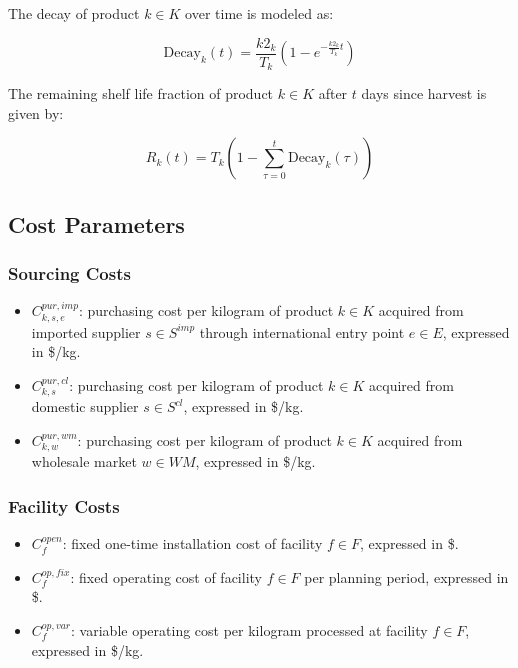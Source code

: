 \documentclass[12pt]{article}
\begin{document}
The decay of product $k \in K$ over time is modeled as:

\[
\text{Decay}_k(t) = \frac{k2_k}{T_k} \left(1 - e^{- \frac{k2_k}{T_k} t} \right)
\]

The remaining shelf life fraction of product $k \in K$ after $t$ days since harvest is given by:

\[
R_k(t) = T_k \left(1 - \sum_{\tau=0}^{t} \text{Decay}_k(\tau) \right)
\]

\subsection{Cost Parameters}

\subsubsection{Sourcing Costs}
\begin{itemize}
    \item $C^{pur,imp}_{k,s,e}$: purchasing cost per kilogram of product $k \in K$ acquired from imported supplier $s \in S^{imp}$ through international entry point $e \in E$, expressed in \$/kg.

    \item $C^{pur,cl}_{k,s}$: purchasing cost per kilogram of product $k \in K$ acquired from domestic supplier $s \in S^{cl}$, expressed in \$/kg.

    \item $C^{pur,wm}_{k,w}$: purchasing cost per kilogram of product $k \in K$ acquired from wholesale market $w \in WM$, expressed in \$/kg.
\end{itemize}

\subsubsection{Facility Costs}
\begin{itemize}
    \item $C^{open}_f$: fixed one-time installation cost of facility $f \in F$, expressed in \$.

    \item $C^{op,fix}_f$: fixed operating cost of facility $f \in F$ per planning period, expressed in \$.
    
    \item $C^{op,var}_f$: variable operating cost per kilogram processed at facility $f \in F$, expressed in \$/kg.
\end{itemize}
\end{document}
